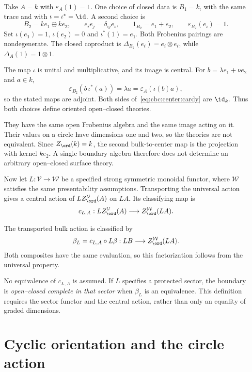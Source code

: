 \begin{example}\label{cbc:center:two-bulks}
Take $A=k$ with $\varepsilon_A(1)=1$.
One choice of closed data is $B_1=k$, with the same trace and with $\iota=\iota^*=\id$.
A second choice is
\[
 B_2=ke_1\oplus ke_2,\qquad
 e_i e_j=\delta_{ij}e_i,\qquad
 1_{B_2}=e_1+e_2,\qquad \varepsilon_{B_2}(e_i)=1.
\]
Set $\iota(e_1)=1$, $\iota(e_2)=0$ and $\iota^*(1)=e_1$.
Both Frobenius pairings are nondegenerate.
The closed coproduct is $\Delta_{B_2}(e_i)=e_i\otimes e_i$, while $\Delta_A(1)=1\otimes1$.

The map $\iota$ is unital and multiplicative, and its image is central.
For $b=\lambda e_1+\nu e_2$ and $a\in k$,
\[
 \varepsilon_{B_2}(b\,\iota^*(a))
   =\lambda a=\varepsilon_A(\iota(b)a),
\]
so the stated maps are adjoint.
Both sides of~\eqref{eq:cbc:center:cardy} are $\id_k$.
Thus both choices define oriented open--closed theories.

They have the same open Frobenius algebra and the same image acting on it.
Their values on a circle have dimensions one and two, so the theories are not equivalent.
Since $Z_{\ord}(k)=k$, the second bulk-to-center map is the projection with kernel $ke_2$.
A single boundary algebra therefore does not determine an arbitrary open--closed surface theory.
\end{example}

Now let $L:\mathcal V\to\mathcal W$ be a specified strong symmetric monoidal functor, where $\mathcal W$ satisfies the same presentability assumptions.
Transporting the universal action gives a central action of $LZ_{\ord}^{\mathcal V}(A)$ on $LA$.
Its classifying map is
\begin{equation}\label{eq:cbc:center:sector-comparison}
 c_{L,A}:LZ_{\ord}^{\mathcal V}(A)
   \longrightarrow Z_{\ord}^{\mathcal W}(LA).
\end{equation}

The transported bulk action is classified by
\[
 \beta_L=c_{L,A}\circ L\beta:
 LB\longrightarrow Z_{\ord}^{\mathcal W}(LA).
\]
Both composites have the same evaluation, so this factorization follows from the universal property.

No equivalence of $c_{L,A}$ is assumed.
If $L$ specifies a protected sector, the boundary is \emph{open--closed complete in that sector} when $\beta_L$ is an equivalence.
This definition requires the sector functor and the central action, rather than only an equality of graded dimensions.

\section{Cyclic orientation and the circle action}

